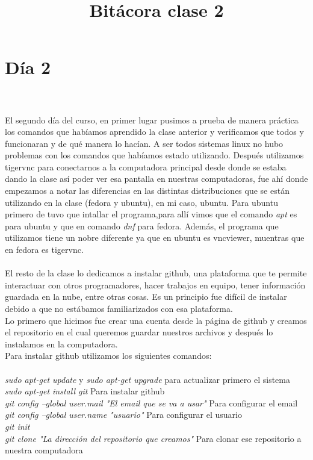 \documentclass{book}
\begin{document}
	\section{Día 2}
		\title{\Huge Bitácora clase 2} \\
	\\
	El segundo día del curso, en primer lugar pusimos a prueba de manera práctica los comandos que habíamos aprendido la clase anterior y verificamos que todos y funcionaran y de qué manera lo hacían. A ser todos sistemas linux no hubo problemas con los comandos que habíamos estado utilizando. Después utilizamos tigervnc para conectarnos a la computadora principal desde donde se estaba dando la clase así poder ver esa pantalla en nuestras computadoras, fue ahí donde empezamos a notar las diferencias en las distintas distribuciones que se están utilizando en la clase (fedora y ubuntu), en mi caso, ubuntu. Para ubuntu primero de tuvo que intallar el programa,para allí vimos que el comando \textit{apt} es para ubuntu y que en comando \textit{dnf} para fedora. Además, el programa que utilizamos tiene un nobre diferente ya que en ubuntu es vncviewer, muentras que en fedora es tigervnc. \\
	\\
	El resto de la clase lo dedicamos a instalar github, una plataforma que te permite interactuar con otros programadores, hacer trabajos en equipo, tener información guardada en la nube, entre otras cosas. Es un principio fue difícil de instalar debido a que no estábamos familiarizados con esa plataforma. \\
	Lo primero que hicimos fue crear una cuenta desde la página de github y creamos el repositorio en el cual queremos guardar nuestros archivos  y después lo instalamos en la computadora.\\
	Para instalar github utilizamos los siguientes comandos:\\
	\\
	\textit{sudo apt-get update} y \textit{sudo apt-get upgrade} para actualizar primero el sistema\\
	\textit{sudo apt-get install git} Para instalar github\\
	\textit{git config --global user.mail "El email que se va a usar"} Para configurar el email\\
	\textit{git config --global user.name "usuario"} Para configurar el usuario\\
	\textit{ git init}\\
	\textit{ git clone "La dirección del repositorio que creamos"} Para clonar ese repositorio a nuestra computadora\\
	
\end{document}
